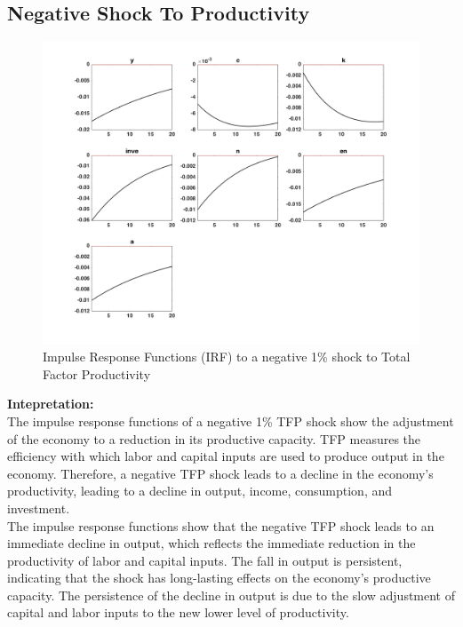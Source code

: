 \documentclass[a4paper,11pt]{article}
\begin{document}
\subsection{Negative Shock To Productivity}
\begin{figure}[H]
    \centering
    \includegraphics[scale=0.4]{IRF_ProductivityShock.png}
    \caption{Impulse Response Functions (IRF) to a negative 1\% shock to Total Factor Productivity}
    \label{fig:my_label}
\end{figure}

\textbf{Intepretation:}\\
The impulse response functions of a negative 1\%  TFP shock show the adjustment of the economy to a reduction in its productive capacity. TFP measures the efficiency with which labor and capital inputs are used to produce output in the economy. Therefore, a negative TFP shock leads to a decline in the economy's productivity, leading to a decline in output, income, consumption, and investment.\\

The impulse response functions show that the negative TFP shock leads to an immediate decline in output, which reflects the immediate reduction in the productivity of labor and capital inputs. The fall in output is persistent, indicating that the shock has long-lasting effects on the economy's productive capacity. The persistence of the decline in output is due to the slow adjustment of capital and labor inputs to the new lower level of productivity.\\
\end{document}
